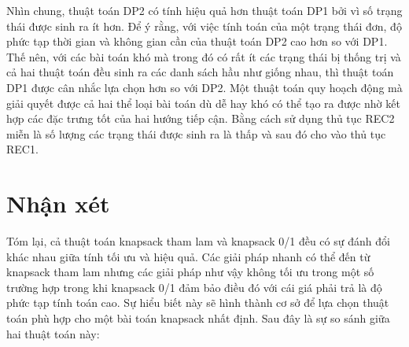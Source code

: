 Nhìn chung, thuật toán DP2 có tính hiệu quả hơn thuật toán DP1 bởi vì số trạng thái được sinh ra ít hơn. Để ý rằng, với việc tính toán của một trạng thái đơn, độ phức tạp thời gian và không gian cần của thuật toán DP2 cao hơn so với DP1. Thế nên, với các bài toán khó mà trong đó có rất ít các trạng thái bị thống trị và cả hai thuật toán đều sinh ra các danh sách hầu như giống nhau, thì thuật toán DP1 được cân nhắc lựa chọn hơn so với DP2. Một thuật toán quy hoạch động mà giải quyết được cả hai thể loại bài toán dù dễ hay khó có thể tạo ra được nhờ kết hợp các đặc trưng tốt của hai hướng tiếp cận. Bằng cách sử dụng thủ tục REC2 miễn là số lượng các trạng thái được sinh ra là thấp và sau đó cho vào thủ tục REC1. 

\section{Nhận xét}

Tóm lại, cả thuật toán knapsack tham lam và knapsack 0/1 đều có sự đánh đổi khác nhau giữa tính tối ưu và hiệu quả. Các giải pháp nhanh có thể đến từ knapsack tham lam nhưng các giải pháp như vậy không tối ưu trong một số trường hợp trong khi knapsack 0/1 đảm bảo điều đó với cái giá phải trả là độ phức tạp tính toán cao. Sự hiểu biết này sẽ hình thành cơ sở để lựa chọn thuật toán phù hợp cho một bài toán knapsack nhất định. Sau đây là sự so sánh giữa hai thuật toán này:

